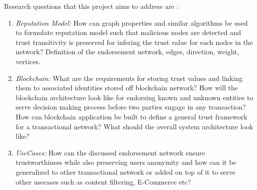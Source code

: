 \documentclass[a4paper,11pt,dvipsnames]{article}
\begin{document}
	Research questions that this project aims to address are : 
	\begin{enumerate}
		\item \textit{Reputation Model:} How can graph properties and similar 
			algorithms be used to formulate reputation model such that 
			malicious nodes are detected and trust transitivity is preserved 
			for infering the trust value for each nodes in the network? 
			Definition of the endorsement network, edges, direction, weight, 
			vertices.

		\item \textit{Blockchain:} What are the requirements for storing trust 
			values and linking them to associated identities stored off 
			blockchain network? How will the blockchain architecture look 
			like for endorsing known and unknown entities to serve decision 
			making process before two parties engage in any transaction? How can 
			blockchain application be built to define a general trust framework 
			for a transactional network? What should the overall system 
			architecture look like? 

		\item \textit{UseCases:} How can the discussed endorsement network 
			ensure trustworthiness while also preserving users anonymity and 
			how can it be generalized to other transactional network or added 
			on top of it to serve other usecases such as content filtering, 
			E-Commerce etc? 
	\end{enumerate}

	
\end{document}
